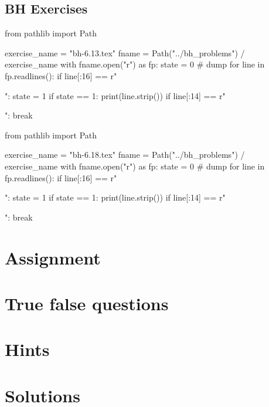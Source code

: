 \subsection{BH Exercises}
\label{sec:bh-exercises-1}


\begin{pycode}
from pathlib import Path

exercise_name = "bh-6.13.tex"
fname = Path("../bh_problems") / exercise_name
with fname.open("r") as fp:
    state = 0  # dump
    for line in fp.readlines():
        if line[:16] == r"\begin{exercise}":
            state = 1
        if state == 1:
            print(line.strip())
        if line[:14] == r"\end{exercise}":
            break
\end{pycode}

\begin{pycode}
from pathlib import Path

exercise_name = "bh-6.18.tex"
fname = Path("../bh_problems") / exercise_name
with fname.open("r") as fp:
    state = 0  # dump
    for line in fp.readlines():
        if line[:16] == r"\begin{exercise}":
            state = 1
        if state == 1:
            print(line.strip())
        if line[:14] == r"\end{exercise}":
            break
\end{pycode}



\section{Assignment}
\label{sec:assignment}

\setcounter{theorem}{0}

%


\section{True false questions}
\label{sec:true-false-questions}
\setcounter{theorem}{0}




\clearpage
\section{Hints}

\clearpage
\section{Solutions}



